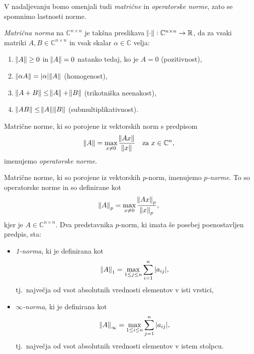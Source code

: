 \documentclass[mat1]{fmfdelo}
\newcommand{\R}{\mathbb R}
\newcommand{\C}{\mathbb C}
\begin{document}
V nadaljevanju bomo omenjali tudi \emph{matrične} in \emph{operatorske norme}, zato se spomnimo lastnosti norme.
\begin{definicija}
    \emph{Matrična norma} na $\C^{n \times n}$ je takšna preslikava $\norm{\cdot}: \C^{n \times n} \rightarrow \R$, da za vsaki matriki $A, B \in \C^{n \times n}$ in vsak skalar $\alpha \in \C$ velja:
    \begin{enumerate}
        \item $\norm{A} \geq 0$ in $\norm{A} = 0$ natanko tedaj, ko je $A = 0$ (pozitivnost),
        \item $\norm{\alpha A} = |\alpha|\norm{A}$ (homogenost),
        \item $\norm{A + B} \leq \norm{A} + \norm{B}$ (trikotniška neenakost), 
        \item $\norm{A B} \leq \norm{A} \norm{B}$ (submultiplikativnost).
    \end{enumerate}
    Matrične norme, ki so porojene iz vektorskih norm s predpisom
    \begin{equation*}
        \norm{A} = \max_{x \neq 0} \frac{\norm{A x}}{\norm{x}}\quad \text{za}\ x\in \C^n,
    \end{equation*}
    imenujemo \emph{operatorske norme}.
\end{definicija}
\begin{zgled}
    Matrične norme, ki so porojene iz vektorskih $p$-norm, imenujemo \emph{$p$-norme}. To so operatorske norme in so definirane kot
    \begin{equation*}
        \norm{A}_p = \max_{x \neq 0} \frac{\norm{A x}_p}{\norm{x}_p},
    \end{equation*}
    kjer je $A \in \C^{n\times n}$. Dva predstavnika $p$-norm, ki imata še posebej poenostavljen predpis, sta:
    \begin{itemize}
        \item \emph{1-norma}, ki je definirana kot
        \begin{equation*}
            \norm{A}_1 = \max_{1 \leq j \leq n} \sum_{i=1}^n |a_{ij}|,
        \end{equation*}
        tj.\ največja od vsot absolutnih vrednosti elementov v isti vrstici,
        \item \emph{$\infty$-norma}, ki je definirana kot
        \begin{equation*}
            \norm{A}_\infty = \max_{1 \leq i \leq n} \sum_{j=1}^n |a_{ij}|,
        \end{equation*}
        tj.\ največja od vsot absolutnih vrednosti elementov v istem stolpcu.
    \end{itemize}
\end{zgled}
\end{document}
